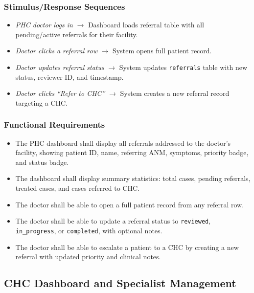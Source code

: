 \documentclass[12pt,a4paper]{article}
\begin{document}
\subsubsection{Stimulus/Response Sequences}
\begin{itemize}
    \item \textit{PHC doctor logs in} $\rightarrow$ Dashboard loads referral table with all pending/active referrals for their facility.
    \item \textit{Doctor clicks a referral row} $\rightarrow$ System opens full patient record.
    \item \textit{Doctor updates referral status} $\rightarrow$ System updates \texttt{referrals} table with new status, reviewer ID, and timestamp.
    \item \textit{Doctor clicks ``Refer to CHC''} $\rightarrow$ System creates a new referral record targeting a CHC.
\end{itemize}

\subsubsection{Functional Requirements}
\begin{itemize}
    \item[\texttt{REQ-PHC-01}] The PHC dashboard shall display all referrals addressed to the doctor's facility, showing patient ID, name, referring ANM, symptoms, priority badge, and status badge.
    \item[\texttt{REQ-PHC-02}] The dashboard shall display summary statistics: total cases, pending referrals, treated cases, and cases referred to CHC.
    \item[\texttt{REQ-PHC-03}] The doctor shall be able to open a full patient record from any referral row.
    \item[\texttt{REQ-PHC-04}] The doctor shall be able to update a referral status to \texttt{reviewed}, \texttt{in\_progress}, or \texttt{completed}, with optional notes.
    \item[\texttt{REQ-PHC-05}] The doctor shall be able to escalate a patient to a CHC by creating a new referral with updated priority and clinical notes.
\end{itemize}

\subsection{CHC Dashboard and Specialist Management}
\end{document}
